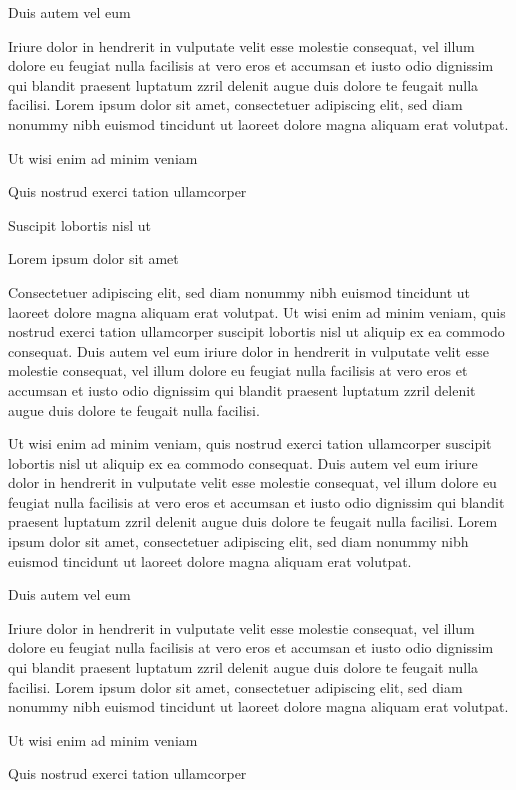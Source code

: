 \documentclass[11pt,twoside]{article}\makeatletter
\begin{document}
Duis autem vel eum \par
Iriure dolor in hendrerit in vulputate velit esse molestie consequat, vel illum dolore eu feugiat nulla facilisis at vero eros et accumsan et iusto odio dignissim qui blandit praesent luptatum zzril delenit augue duis dolore te feugait nulla facilisi. Lorem ipsum dolor sit amet, consectetuer adipiscing elit, sed diam nonummy nibh euismod tincidunt ut laoreet dolore magna aliquam erat volutpat. \par
Ut wisi enim ad minim veniam\par
Quis nostrud exerci tation ullamcorper \par
Suscipit lobortis nisl ut \par
Lorem ipsum dolor sit amet\par
Consectetuer adipiscing elit, sed diam nonummy nibh euismod tincidunt ut laoreet dolore magna aliquam erat volutpat. Ut wisi enim ad minim veniam, quis nostrud exerci tation ullamcorper suscipit lobortis nisl ut aliquip ex ea commodo consequat. Duis autem vel eum iriure dolor in hendrerit in vulputate velit esse molestie consequat, vel illum dolore eu feugiat nulla facilisis at vero eros et accumsan et iusto odio dignissim qui blandit praesent luptatum zzril delenit augue duis dolore te feugait nulla facilisi.\par
Ut wisi enim ad minim veniam, quis nostrud exerci tation ullamcorper suscipit lobortis nisl ut aliquip ex ea commodo consequat. Duis autem vel eum iriure dolor in hendrerit in vulputate velit esse molestie consequat, vel illum dolore eu feugiat nulla facilisis at vero eros et accumsan et iusto odio dignissim qui blandit praesent luptatum zzril delenit augue duis dolore te feugait nulla facilisi. Lorem ipsum dolor sit amet, consectetuer adipiscing elit, sed diam nonummy nibh euismod tincidunt ut laoreet dolore magna aliquam erat volutpat. \par
Duis autem vel eum \par
Iriure dolor in hendrerit in vulputate velit esse molestie consequat, vel illum dolore eu feugiat nulla facilisis at vero eros et accumsan et iusto odio dignissim qui blandit praesent luptatum zzril delenit augue duis dolore te feugait nulla facilisi. Lorem ipsum dolor sit amet, consectetuer adipiscing elit, sed diam nonummy nibh euismod tincidunt ut laoreet dolore magna aliquam erat volutpat. \par
Ut wisi enim ad minim veniam\par
Quis nostrud exerci tation ullamcorper \par
\end{document}
